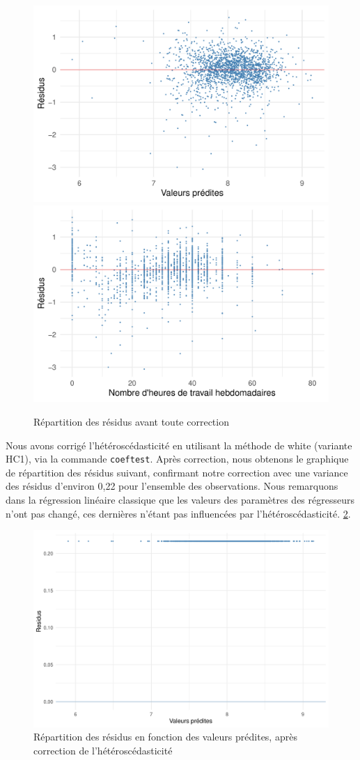\documentclass[a4paper, french, 11 pt]{article}\usepackage[]{graphicx}\usepackage[]{xcolor}
\begin{document}
\begin{figure}[h]
\center
\includegraphics[width=0.49\linewidth]{figure/plot_hetero_fitted.pdf}
\includegraphics[width=0.49\linewidth]{figure/plot_hetero_heures.pdf}
\caption{Répartition des résidus avant toute correction\label{fig:hetero}}
\end{figure}



Nous avons corrigé l'hétéroscédasticité en utilisant la méthode de white (variante HC1), via la commande \verb+coeftest+. Après correction, nous obtenons le graphique de répartition des résidus suivant, confirmant notre correction avec une variance des résidus d’environ 0,22 pour l’ensemble des observations. Nous remarquons dans la régression linéaire classique que les valeurs des paramètres des régresseurs n’ont pas changé, ces dernières n’étant pas influencées par l’hétéroscédasticité. \ref{fig:hetero_correct}.

\begin{figure}[h]
\center
\includegraphics[width=0.7\linewidth]{figure/hetero_correct.pdf}
\caption{Répartition des résidus en fonction des valeurs prédites, après correction de l'hétéroscédasticité\label{fig:hetero_correct}}
\end{figure}
\end{document}

